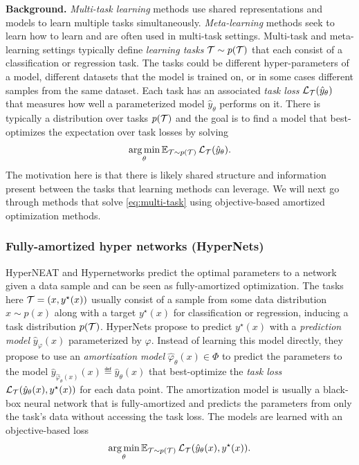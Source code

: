 \documentclass[twoside,11pt]{article}
\begin{document}
\textbf{Background.}
\emph{Multi-task learning} \citep{caruana1997multitask,ruder2017overview}
methods use shared representations and models to learn
multiple tasks simultaneously.
\emph{Meta-learning} methods \citep{ward1937reminiscence,harlow1949formation,schmidhuber1987evolutionary,kehoe1988layered,schmidhuber1995learning,thrun1998learning,baxter1998theoretical,hochreiter2001learning,vilalta2002perspective,lv2017learning,li2016learning,li2017learning,lake2017building,weng2018metalearning,hospedales2020meta}
seek to learn how to learn and are often used
in multi-task settings.
Multi-task and meta-learning settings typically define
\emph{learning tasks} ${\mathcal{T}}\sim p({\mathcal{T}})$ that each consist of
a classification or regression task.
The tasks could be different hyper-parameters of a model,
different datasets that the model is trained on, or
in some cases different samples from the same dataset.
Each task has an associated
\emph{task loss} ${\mathcal{L}}_{{\mathcal{T}}}(\hat y_\theta)$
that measures how well a parameterized model $\hat y_\theta$
performs on it.
There is typically a distribution over tasks $p({\mathcal{T}})$ and
the goal is to find a model that
best-optimizes the expectation over task losses by solving
\begin{equation}
  \operatorname*{arg\,min}_\theta \operatorname{\mathbb{E}}_{{\mathcal{T}}\sim p({\mathcal{T}})} {\mathcal{L}}_{{\mathcal{T}}}(\hat y_\theta). \label{eq:multi-task}
\end{equation}
The motivation here is that there is likely shared structure
and information present between the tasks that learning
methods can leverage.
We will next go through methods that solve \cref{eq:multi-task}
using objective-based amortized optimization methods.

\subsubsection{Fully-amortized hyper networks (HyperNets)}
HyperNEAT \citep{stanley2009hypercube} and
Hypernetworks \citep{ha2016hypernetworks}
predict the optimal parameters to a network given a
data sample and can be seen as fully-amortized optimization.
The tasks here ${\mathcal{T}}=(x,y^\star(x))$ usually consist of
a sample from some data distribution
$x\sim p(x)$ along with a target $y^\star(x)$
for classification or regression,
inducing a task distribution $p({\mathcal{T}})$.
HyperNets propose to predict $y^\star(x)$ with a \emph{prediction model}
$\hat y_\varphi(x)$ parameterized by $\varphi$.
Instead of learning this model directly, they propose to
use an \emph{amortization model} $\hat \varphi_\theta(x)\in\Phi$
to predict the parameters to the model
$\hat y_{\hat \varphi_\theta(x)}(x)\eqdef \hat y_\theta(x)$
that best-optimize the \emph{task loss} ${\mathcal{L}}_{\mathcal{T}}(\hat y_\theta(x), y^\star(x))$
for each data point.
The amortization model is usually a
black-box neural network that is fully-amortized and
predicts the parameters from only the task's data
without accessing the task loss.
The models are learned with an objective-based loss
\begin{equation}
  \operatorname*{arg\,min}_\theta \operatorname{\mathbb{E}}_{{\mathcal{T}}\sim p({\mathcal{T}})} {\mathcal{L}}_{\mathcal{T}}(\hat y_\theta(x), y^\star(x)).
  \label{eq:hypernet}
\end{equation}
\end{document}
